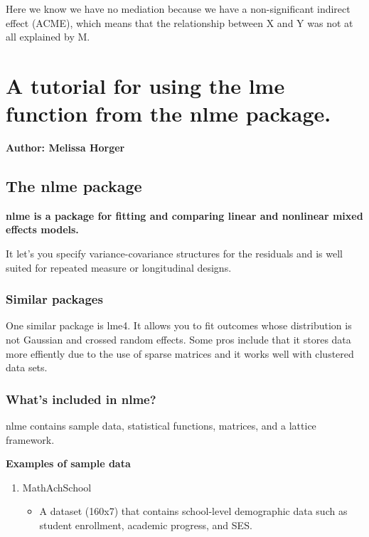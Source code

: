 \documentclass[]{book}
\providecommand{\tightlist}{%
  \setlength{\itemsep}{0pt}\setlength{\parskip}{0pt}}
\begin{document}
Here we know we have no mediation because we have a non-significant indirect effect (ACME), which means that the relationship between X and Y was not at all explained by M.

\hypertarget{a-tutorial-for-using-the-lme-function-from-the-nlme-package.}{%
\chapter{A tutorial for using the lme function from the nlme package.}\label{a-tutorial-for-using-the-lme-function-from-the-nlme-package.}}

\textbf{Author: Melissa Horger}

\hypertarget{the-nlme-package}{%
\section{The nlme package}\label{the-nlme-package}}

\textbf{nlme is a package for fitting and comparing linear and nonlinear mixed effects models.}

It let's you specify variance-covariance structures for the residuals and is well suited for repeated measure or longitudinal designs.

\hypertarget{similar-packages}{%
\subsection{Similar packages}\label{similar-packages}}

One similar package is lme4.
It allows you to fit outcomes whose distribution is not Gaussian and crossed random effects.
Some pros include that it stores data more effiently due to the use of sparse matrices and it works well with clustered data sets.

\hypertarget{whats-included-in-nlme}{%
\subsection{What's included in nlme?}\label{whats-included-in-nlme}}

nlme contains sample data, statistical functions, matrices, and a lattice framework.

\textbf{Examples of sample data}

\begin{enumerate}
\def\labelenumi{\arabic{enumi}.}
\tightlist
\item
  MathAchSchool

  \begin{itemize}
  \tightlist
  \item
    A dataset (160x7) that contains school-level demographic data such as student enrollment, academic progress, and SES.
  \end{itemize}
\end{enumerate}
\end{document}
